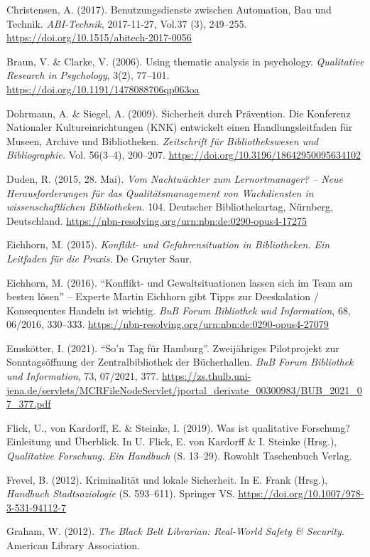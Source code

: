 \documentclass[a4paper,
fontsize=11pt,
oneside,
numbers=noperiodatend,
parskip=half-,
bibliography=totoc,
final
]{scrartcl}
\begin{document}
Christensen, A. (2017). Benutzungsdienste zwischen Automation, Bau und
Technik. \emph{ABI-Technik}, 2017-11-27, Vol.37 (3), 249--255.
\url{https://doi.org/10.1515/abitech-2017-0056}

Braun, V. \& Clarke, V. (2006). Using thematic analysis in psychology.
\emph{Qualitative Research in Psychology}, 3(2), 77--101.
\url{https://doi.org/10.1191/1478088706qp063oa}

Dohrmann, A. \& Siegel, A. (2009). Sicherheit durch Prävention. Die
Konferenz Nationaler Kultureinrichtungen (KNK) entwickelt einen
Handlungsleitfaden für Museen, Archive und Bibliotheken.
\emph{Zeitschrift für Bibliothekswesen und Bibliographie.} Vol.
56(3--4), 200--207. \url{https://doi.org/10.3196/18642950095634102}

Duden, R. (2015, 28. Mai). \emph{Vom Nachtwächter zum Lernortmanager? --
Neue Herausforderungen für das Qualitätsmanagement von Wachdiensten in
wissenschaftlichen Bibliotheken.} 104. Deutscher Bibliothekartag,
Nürnberg, Deutschland.
\url{https://nbn-resolving.org/urn:nbn:de:0290-opus4-17275}

Eichhorn, M. (2015). \emph{Konflikt- und Gefahrensituation in
Bibliotheken. Ein Leitfaden für die Praxis.} De Gruyter Saur.

Eichhorn, M. (2016). \enquote{Konflikt- und Gewaltsituationen lassen
sich im Team am besten lösen} -- Experte Martin Eichhorn gibt Tipps zur
Deeskalation / Konsequentes Handeln ist wichtig. \emph{BuB Forum
Bibliothek und Information}, 68, 06/2016, 330--333.
\url{https://nbn-resolving.org/urn:nbn:de:0290-opus4-27079}

\sloppy
Emskötter, I. (2021). \enquote{So'n Tag für Hamburg}. Zweijähriges
Pilotprojekt zur Sonntagsöffnung der Zentralbibliothek der Bücherhallen.
\emph{BuB Forum Bibliothek und Information}, 73, 07/2021, 377.
\url{https://zs.thulb.uni-jena.de/servlets/MCRFileNodeServlet/jportal_derivate_00300983/BUB_2021_07_377.pdf}

Flick, U., von Kardorff, E. \& Steinke, I. (2019). Was ist qualitative
Forschung? Einleitung und Überblick. In U. Flick, E. von Kardorff \& I.
Steinke (Hrsg.), \emph{Qualitative Forschung. Ein Handbuch} (S. 13--29).
Rowohlt Taschenbuch Verlag.

Frevel, B. (2012). Kriminalität und lokale Sicherheit. In E. Frank
(Hrsg.), \emph{Handbuch Stadtsoziologie} (S. 593--611). Springer VS.
\url{https://doi.org/10.1007/978-3-531-94112-7}

Graham, W. (2012). \emph{The Black Belt Librarian: Real-World Safety \&
Security.} American Library Association.
\end{document}
